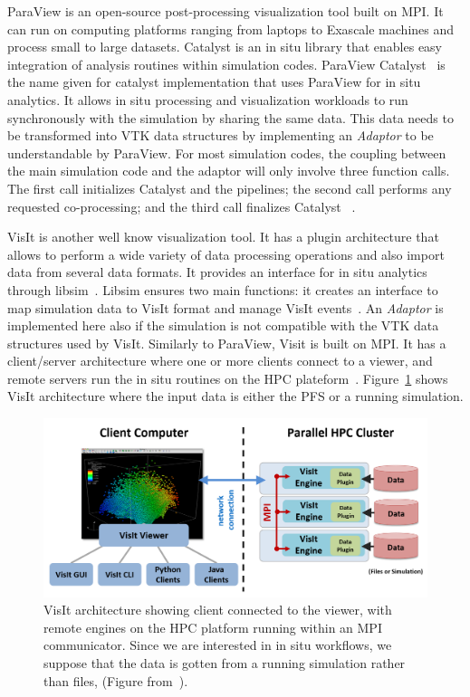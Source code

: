 ParaView is an open-source post-processing visualization tool built on MPI. It can run on computing platforms ranging from laptops to Exascale machines and process small to large datasets. Catalyst is an in situ library that enables easy integration of analysis routines within simulation codes.
ParaView Catalyst~\cite{bauer_paraview_2016, noauthor_using_paraview, noauthor_paraview_nodate, cscsch_situ_2022, ayachit2021catalyst} is the name given for catalyst implementation that uses ParaView for in situ analytics. It allows in situ processing and visualization workloads to run synchronously with the simulation by sharing the same data. This data needs to be transformed into VTK data structures by implementing an \textit{Adaptor} to be understandable by ParaView. 
For most simulation codes, the coupling between the main simulation code and the adaptor will only
involve three function calls. The first call initializes Catalyst and the pipelines; the second call performs any
requested co-processing; and the third call finalizes Catalyst
~\cite{catalyst, paraview_catalyst_examples_2022}.

VisIt is another well know visualization tool. It has a plugin architecture that allows to perform a wide variety of data processing operations and also import data from several data formats. It provides an interface for in situ analytics through libsim~\cite{childs_situ_libsim_2022}. Libsim ensures two main functions: it creates an interface  to map simulation data to VisIt format and manage VisIt events~\cite{ dreher_methodes_2015}.
An \textit{Adaptor} is implemented here also if the simulation is not compatible with the VTK data structures used by VisIt. 
Similarly to ParaView, Visit is built on MPI. It has a client/server architecture where one or more clients connect to a viewer, and remote servers run the in situ routines on the HPC plateform~\cite{noauthor_visit_works}. Figure~\ref{figvisit} shows VisIt architecture where the input data is either the PFS or a running simulation.

\begin{figure}[tb]\centering
\includegraphics[scale=0.5]{figures/Visit-Architecture.png}
\caption{VisIt architecture showing client connected to the viewer, with remote engines on the HPC platform running within an MPI communicator. Since we are interested in in situ workflows, we suppose that the data is gotten from a running simulation rather than files, (Figure from~\cite{noauthor_visit_works}).}
\label{figvisit}
\end{figure}

